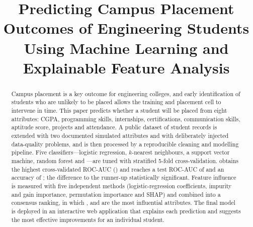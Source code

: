 \documentclass[conference]{IEEEtran}
\begin{document}
\title{Predicting Campus Placement Outcomes of Engineering Students Using Machine Learning and Explainable Feature Analysis}

\author{
\and
{}
}

\maketitle

\begin{abstract}
Campus placement is a key outcome for engineering colleges, and early identification of students who are
unlikely to be placed allows the training and placement cell to intervene in time. This paper predicts whether
a student will be placed from eight attributes: CGPA, programming skills, internships, certifications,
communication skills, aptitude score, projects and attendance. A public dataset of \RawRows{} student records is
extended with two documented simulated attributes and with deliberately injected data-quality problems, and is
then processed by a reproducible cleaning and modelling pipeline. Five classifiers---logistic regression,
$k$-nearest neighbours, a support vector machine, random forest and \XGBName{}---are tuned with stratified
5-fold cross-validation. \BestModel{} obtains the highest cross-validated ROC-AUC (\BestCVAUC{}) and reaches a
test ROC-AUC of \BestTestAUC{} and an accuracy of \BestTestAcc{}; the difference to the runner-up \StatSig{}
statistically significant. Feature influence is measured with five independent methods (logistic-regression
coefficients, impurity and gain importance, permutation importance and SHAP) and combined into a consensus
ranking, in which \TopOne{}, \TopTwo{} and \TopThree{} are the most influential attributes. The final model is
deployed in an interactive web application that explains each prediction and suggests the most effective
improvements for an individual student.
\end{abstract}
\end{document}
